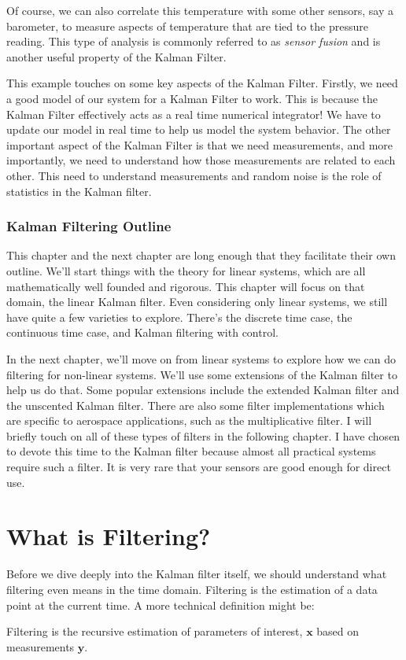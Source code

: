 Of course, we can also correlate this temperature with some other sensors, say a barometer, to measure aspects of temperature that are tied to the pressure reading. This type of analysis is commonly referred to as \textit{sensor fusion} and is another useful property of the Kalman Filter.

This example touches on some key aspects of the Kalman Filter. Firstly, we need a good model of our system for a Kalman Filter to work. This is because the Kalman Filter effectively acts as a real time numerical integrator! We have to update our model in real time to help us model the system behavior. The other important aspect of the Kalman Filter is that we need measurements, and more importantly, we need to understand how those measurements are related to each other. This need to understand measurements and random noise is the role of statistics in the Kalman filter.

\subsubsection{Kalman Filtering Outline}
This chapter and the next chapter are long enough that they facilitate their own outline. We'll start things with the theory for linear systems, which are all mathematically well founded and rigorous. This chapter will focus on that domain, the linear Kalman filter. Even considering only linear systems, we still have quite a few varieties to explore. There's the discrete time case, the continuous time case, and Kalman filtering with control.

In the next chapter, we'll move on from linear systems to explore how we can do filtering for non-linear systems. We'll use some extensions of the Kalman filter to help us do that. Some popular extensions include the extended Kalman filter and the unscented Kalman filter. There are also some filter implementations which are specific to aerospace applications, such as the multiplicative filter. I will briefly touch on all of these types of filters in the following chapter. I have chosen to devote this time to the Kalman filter because almost all practical systems require such a filter. It is very rare that your sensors are good enough for direct use.

\section{What is Filtering?}
Before we dive deeply into the Kalman filter itself, we should understand what filtering even means in the time domain. Filtering is the estimation of a data point at the current time. A more technical definition might be:
\begin{definition}[Filtering]
    Filtering is the recursive estimation of parameters of interest, $\bm{x}$ based on measurements $\bm{y}$.
\end{definition}

